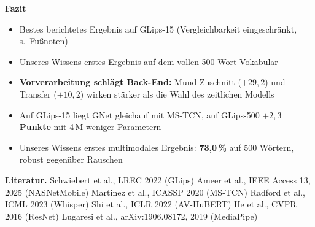\documentclass[a0,portrait]{a0poster}
\newcommand{\phead}[1]{{\color{bwkiblau}\normalsize\bfseries #1}\par\vspace{0.2cm}}
\begin{document}
\begin{minipage}[t]{\rcol}\vspace{0pt}
\begin{tcolorbox}[width=\linewidth, colback=conclusion, frame empty, sharp corners,
                  boxsep=0.7cm, left=0pt, right=0pt, top=0pt, bottom=0pt]
\phead{Fazit}
\begin{itemize}
  \item Bestes berichtetes Ergebnis auf GLips-15 (Vergleichbarkeit eingeschränkt, s.\ Fußnoten)
  \item Unseres Wissens erstes Ergebnis auf dem vollen 500-Wort-Vokabular
  \item \textbf{Vorverarbeitung schlägt Back-End:} Mund-Zuschnitt ($+29{,}2$) und Transfer
        ($+10{,}2$) wirken stärker als die Wahl des zeitlichen Modells
  \item Auf GLips-15 liegt GNet gleichauf mit MS-TCN, auf GLips-500 \textbf{$+2{,}3$ Punkte} mit 4\,M weniger Parametern
  \item Unseres Wissens erstes multimodales Ergebnis: \textbf{73,0\,\%} auf 500 Wörtern, robust gegenüber Rauschen
\end{itemize}
\end{tcolorbox}

\end{minipage}

\vspace{0.15cm}\noindent
{\scriptsize\color{textgray}\raggedright
\textbf{\color{bwkiblau}Literatur.}
Schwiebert et al., LREC 2022 (GLips) \textbullet{}
Ameer et al., IEEE Access 13, 2025 (NASNetMobile) \textbullet{}
Martinez et al., ICASSP 2020 (MS-TCN) \textbullet{}
Radford et al., ICML 2023 (Whisper) \textbullet{}
Shi et al., ICLR 2022 (AV-HuBERT) \textbullet{}
He et al., CVPR 2016 (ResNet) \textbullet{}
Lugaresi et al., arXiv:1906.08172, 2019 (MediaPipe)\par}
\end{document}
